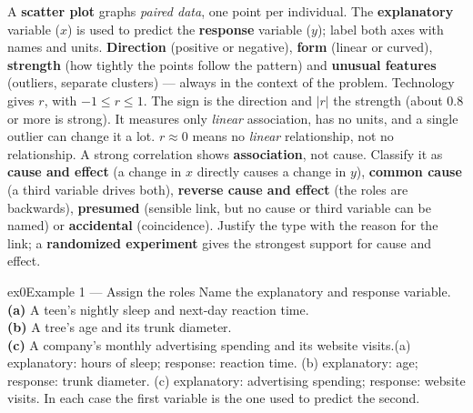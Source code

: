 \documentclass[11pt]{article}
\begin{document}
\begin{learnbox}
A \textbf{scatter plot} graphs \emph{paired data}, one point per individual. The \textbf{explanatory} variable ($x$) is used to predict the \textbf{response} variable ($y$); label both axes with names and units.
\textbf{Direction} (positive or negative), \textbf{form} (linear or curved), \textbf{strength} (how tightly the points follow the pattern) and \textbf{unusual features} (outliers, separate clusters) --- always in the context of the problem.
Technology gives $r$, with $-1\le r\le1$. The sign is the direction and $|r|$ the strength (about $0.8$ or more is strong). It measures only \emph{linear} association, has no units, and a single outlier can change it a lot. $r\approx0$ means no \emph{linear} relationship, not no relationship.
A strong correlation shows \textbf{association}, not cause. Classify it as \textbf{cause and effect} (a change in $x$ directly causes a change in $y$), \textbf{common cause} (a third variable drives both), \textbf{reverse cause and effect} (the roles are backwards), \textbf{presumed} (sensible link, but no cause or third variable can be named) or \textbf{accidental} (coincidence). Justify the type with the reason for the link; a \textbf{randomized experiment} gives the strongest support for cause and effect.
\end{learnbox}


\begin{example}{ex0}{Example 1 --- Assign the roles}
Name the explanatory and response variable. \\ \textbf{(a)} A teen's nightly sleep and next-day reaction time. \\ \textbf{(b)} A tree's age and its trunk diameter. \\ \textbf{(c)} A company's monthly advertising spending and its website visits.\soln (a) explanatory: hours of sleep; response: reaction time. (b) explanatory: age; response: trunk diameter. (c) explanatory: advertising spending; response: website visits. In each case the first variable is the one used to predict the second.
\end{example}
\end{document}
